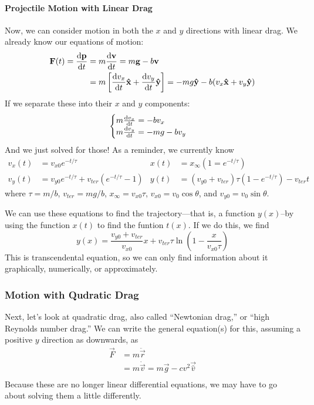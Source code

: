 \documentclass[a4paper]{article}
\begin{document}
\paragraph{Projectile Motion with Linear Drag}
Now, we can consider motion in both the $x$ and $y$ directions with linear
drag. We already know our equations of motion:
\begin{align*}
    \boldsymbol{\mathbf{F}}(t) = \frac{\mathrm{d} \boldsymbol{\mathbf{p}}}{\mathrm{d} t} &= m\frac{\mathrm{d} \boldsymbol{\mathbf{v}}}{\mathrm{d} t}
        = m\boldsymbol{\mathbf{g}}-b\boldsymbol{\mathbf{v}}\\
    &= m\left[\frac{\mathrm{d} v_x}{\mathrm{d} t}\boldsymbol{\mathbf{\hat{x}}} + \frac{\mathrm{d} v_y}{\mathrm{d} t}\boldsymbol{\mathbf{\hat{y}}}\right]
    = -mg\boldsymbol{\mathbf{\hat{y}}} -b(v_x\boldsymbol{\mathbf{\hat{x}}}+v_y\boldsymbol{\mathbf{\hat{y}}})
\end{align*}
If we separate these into their $x$ and $y$ components:
\[
    \begin{cases}
        m\frac{\mathrm{d} v_x}{\mathrm{d} t} = -bv_x\\
        m\frac{\mathrm{d} v_y}{\mathrm{d} t} = -mg-bv_y
    \end{cases}    
\]
And we just solved for those! As a reminder, we currently know
\begin{align*}
    v_x(t) &= v_{x0}e^{-t/\tau} & x(t) &= x_{\infty}(1=e^{-t/\tau})\\
    v_y(t) &= v_{y0}e^{-t/\tau}+v_{ter}(e^{-t/\tau}-1) &
        y(t) &= (v_{y0}+v_{ter})\tau(1-e^{-t/\tau})-v_{ter}t
\end{align*}
where $\tau=m/b$, $v_{ter}=mg/b$, $x_{\infty}=v_{x0}\tau$,
    $v_{x0} = v_0\cos\theta$, and $v_{y0} = v_0\sin\theta$.

We can use these equations to find the trajectory---that is, a function
$y(x)$--by using the function $x(t)$ to find the funtion $t(x)$. If we do this,
we find
\[
    y(x) = \frac{v_{y0}+v_{ter}}{v_{x0}}x+
        v_{ter}\tau\ln\left(1-\frac{x}{v_{x0}\tau}\right)
\] 
This is  transcendental equation, so we can only find information about it
graphically, numerically, or approximately.


\subsubsection{Motion with Qudratic Drag}
Next, let's look at quadratic drag, also called ``Newtonian drag,'' or
``high Reynolds number drag.'' We can write the general equation(s) for this,
assuming a positive $y$ direction as downwards, as
\begin{align*}
    \vec{F} &= m\ddot{\vec{r}}\\
    &= m\dot{\vec{v}} = m\vec{g}-cv^2\vec{\hat{v}}\\
\end{align*}
Because these are no longer linear differential equations, we may have to go
about solving them a little differently.
\end{document}
